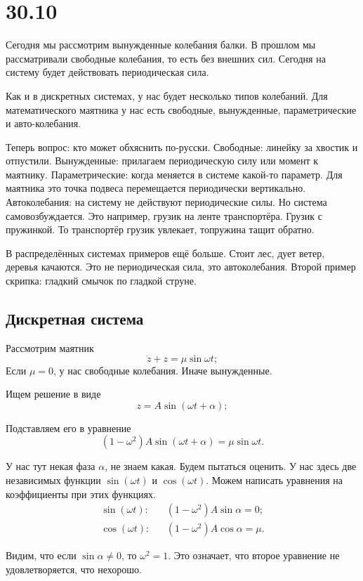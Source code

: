 \section{30.10}
Сегодня мы рассмотрим вынужденные колебания балки. В прошлом мы рассматривали свободные колебания, то есть без внешних сил.
Сегодня на систему будет действовать периодическая сила.

Как и в дискретных системах, у нас будет несколько типов колебаний. Для математического маятника у нас есть свободные, вынужденные, параметрические и авто-колебания.

Теперь вопрос: кто может обхяснить по-русски.
Свободные: линейку за хвостик и отпустили.
Вынужденные: прилагаем периодическую силу или момент к маятнику.
Параметрические: когда меняется в системе какой-то параметр. Для маятника это точка подвеса перемещается периодически вертикально.
Автоколебания: на систему не действуют периодические силы. Но система самовозбуждается. Это например, грузик на ленте транспортёра. Грузик с пружинкой. То транспортёр грузик увлекает, топружина тащит обратно.

В распределённых системах примеров ещё больше. Стоит лес, дует ветер, деревья качаются. Это не периодическая сила, это автоколебания. Второй пример скрипка: гладкий смычок по гладкой струне.


\subsection{Дискретная система}
Рассмотрим маятник
\[
  \ddot z + z  = \mu \sin \omega t;
\]
Если $\mu = 0$, у нас свободные колебания. Иначе вынужденные.

Ищем решение в виде
\[
  z = A \sin(\omega t + \alpha );
\]

Подставляем его в уравнение
\[
  (1 - \omega^2) A \sin (\omega t + \alpha) = \mu\sin\omega t.
\]

У нас тут некая фаза $\alpha$, не знаем какая. Будем пытаться оценить. У нас здесь две независимых функции $\sin(\omega t)$ и $\cos(\omega t)$. Можем написать уравнения на коэффициенты при этих функциях.
\begin{eqnarray*}
  \sin(\omega t)\colon && (1-\omega^2)A\sin\alpha = 0;\\
  \cos(\omega t)\colon && (1-\omega^2)A\cos\alpha = \mu.
\end{eqnarray*}

Видим, что если $\sin\alpha\ne 0$, то $\omega^2 = 1$. Это означает, что второе уравнение не удовлетворяется, что нехорошо.


